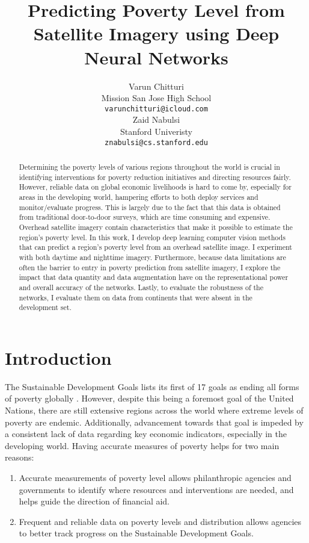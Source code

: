 \documentclass{article}
\title{Predicting Poverty Level from Satellite Imagery using Deep Neural Networks
}
\author{
  Varun Chitturi \\
  Mission San Jose High School\\
  \texttt{varunchitturi@icloud.com} \\
  \AND
  Zaid Nabulsi \\
  Stanford Univeristy\\
  \texttt{znabulsi@cs.stanford.edu} \\
}
\begin{document}

\maketitle

\begin{abstract}
Determining the poverty levels of various regions throughout the world is crucial in identifying interventions for poverty reduction initiatives and directing resources fairly. However, reliable data on global economic livelihoods is hard to come by, especially for areas in the developing world, hampering efforts to both deploy services and monitor/evaluate progress. This is largely due to the fact that this data is obtained from traditional door-to-door surveys, which are time consuming and expensive. Overhead satellite imagery contain characteristics that make it possible to estimate the region's poverty level. In this work, I develop deep learning computer vision methods that can predict a region's poverty level from an overhead satellite image. I experiment with both daytime and nighttime imagery. Furthermore, because data limitations are often the barrier to entry in poverty prediction from satellite imagery, I explore the impact that data quantity and data augmentation have on the representational power and overall accuracy of the networks. Lastly, to evaluate the robustness of the networks, I evaluate them on data from continents that were absent in the development set. 

\end{abstract}

\section{Introduction}
The Sustainable Development Goals lists its first of 17 goals as ending all forms of poverty globally \cite{one}. However, despite this being a foremost goal of the United Nations, there are still extensive regions across the world where extreme levels of poverty are endemic. Additionally, advancement towards that goal is impeded by a consistent lack of data regarding key economic indicators, especially in the developing world. Having accurate measures of poverty helps for two main reasons:

\begin{enumerate}
    \item Accurate measurements of poverty level allows philanthropic agencies and governments to identify where resources and interventions are needed, and helps guide the direction of financial aid.
    \item Frequent and reliable data on poverty levels and distribution allows agencies to better track progress on the Sustainable Development Goals.
\end{enumerate}
\end{document}
